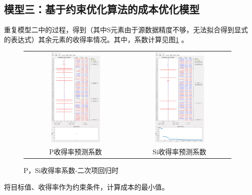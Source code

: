 \documentclass[12pt]{article}%
\begin{document}
\subsection{模型三：基于约束优化算法的成本优化模型}
重复模型二中的过程，得到（其中S元素由于源数据精度不够，无法拟合得到显式的表达式）其余元素的收得率情况。其中，系数计算见图\ref{fig:ercixP}
。
\begin{figure}[htbp]
  \centering
  \begin{tabular}{cc}
  \includegraphics[width=0.5\textwidth]{picture/PPTT3} & \includegraphics[width=0.5\textwidth]{picture/PPTT4} \\
    P收得率预测系数 & Si收得率预测系数 \\
  \end{tabular}
  \caption{P，Si收得率系数-二次项回归时}\label{fig:ercixP}
\end{figure}
将目标值、收得率作为约束条件，计算成本的最小值。
\end{document}
